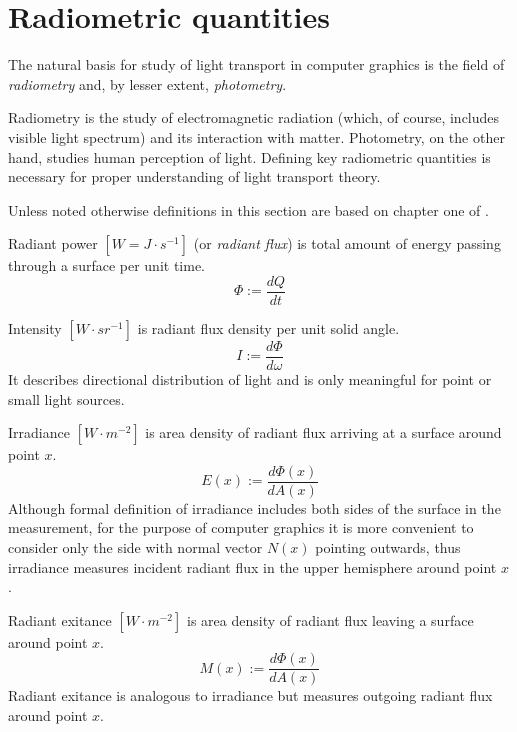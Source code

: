 \section{Radiometric quantities}
The natural basis for study of light transport in computer graphics is the field of \emph{radiometry} and, by lesser extent, \emph{photometry}.

Radiometry is the study of electromagnetic radiation (which, of course, includes visible light spectrum) and its interaction with matter. Photometry, on the other hand, studies human perception of light. Defining key radiometric quantities is necessary for proper understanding of light transport theory.

Unless noted otherwise definitions in this section are based on chapter one of \cite{mccluney94}.

\begin{df}
Radiant power $[W=J \cdot s^{-1}]$ (or \emph{radiant flux}) is total amount of energy passing through a surface per unit time.
\begin{equation}
  \Phi := \frac{dQ}{dt}
\end{equation}
\end{df}

\begin{df}
Intensity $[W \cdot sr^{-1}]$ is radiant flux density per unit solid angle.
\begin{equation}
  I := \frac{d\Phi}{d\omega}
\end{equation}
It describes directional distribution of light and is only meaningful for point or small light sources.
\end{df}

\begin{df}
Irradiance $[W \cdot m^{-2}]$ is  area density of radiant flux arriving at a surface around point $x$.
\begin{equation}
  E(x) := \frac{d\Phi(x)}{dA(x)}
\end{equation}
Although formal definition of irradiance includes both sides of the surface in the measurement, for the purpose of computer graphics it is more convenient to consider only the side with normal vector $N(x)$ pointing outwards, thus irradiance measures incident radiant flux in the upper hemisphere around point $x$.
\end{df}

\begin{df}
Radiant exitance $[W \cdot m^{-2}]$ \parencite{nicodemus78} is area density of radiant flux leaving a surface around point $x$.
\begin{equation}
  M(x) := \frac{d\Phi(x)}{dA(x)}
\end{equation}
Radiant exitance is analogous to irradiance but measures outgoing radiant flux around point $x$.
\end{df}

